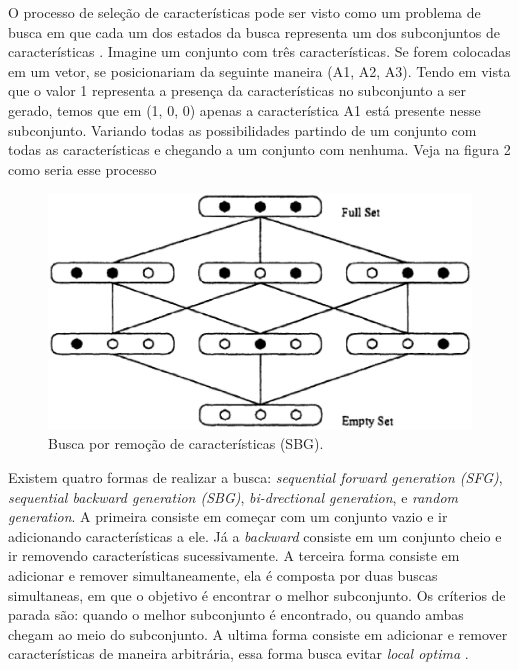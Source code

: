 O processo de seleção de características pode ser visto como um problema de busca em que cada um dos estados da busca representa um dos subconjuntos de características \cite{huan_1998}. Imagine um conjunto com três características. Se forem colocadas em um vetor, se posicionariam da seguinte maneira (A1, A2, A3). Tendo em vista que o valor 1 representa a presença da características no subconjunto a ser gerado, temos que em (1, 0, 0) apenas a característica A1 está presente nesse subconjunto. Variando todas as possibilidades partindo de um conjunto com todas as características e chegando a um conjunto com nenhuma. Veja na figura 2 como seria esse processo

\begin{figure}[h]
	\centering
	\label{fig03}
		\includegraphics[keepaspectratio=true,scale=0.6]{figuras/fig03.eps}
	\caption{Busca por remoção de características (SBG). \cite{huan_1998}}
\end{figure}

Existem quatro formas de realizar a busca: \textit{sequential forward generation (SFG)}, \textit{ sequential backward generation (SBG)}, \textit{bi-drectional generation}, e \textit{random generation}. A primeira consiste em começar com um conjunto vazio e ir adicionando características a ele. Já a \textit{backward} consiste em um conjunto cheio e ir removendo características sucessivamente. A terceira forma consiste em adicionar e remover simultaneamente, ela é composta por duas buscas simultaneas, em que o objetivo é encontrar o melhor subconjunto. Os críterios de parada são: quando o melhor subconjunto é encontrado, ou quando ambas chegam ao meio do subconjunto. A ultima forma consiste em adicionar e remover características de maneira arbitrária, essa forma busca evitar \textit{local optima} \cite{liu_2005}. 

